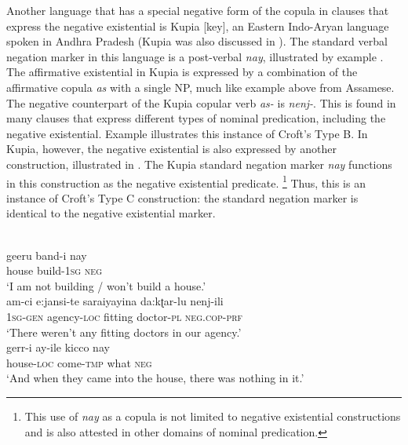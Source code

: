 ﻿\documentclass[output=paper]{langsci/langscibook}
\begin{document}
Another language that has a special negative form of the copula in clauses
that express the negative existential is Kupia [key], an Eastern
Indo-Aryan language spoken in Andhra Pradesh (Kupia was also discussed in
).  The standard verbal negation marker in this language is a
post-verbal \textit{nay}, illustrated by example
. The affirmative existential in Kupia is
expressed by a combination of the affirmative copula \textit{as} with a
single NP, much like example  above from
Assamese. The negative counterpart of the Kupia copular verb
\textit{as-} is \textit{nenj-}. This is found in many clauses that express
different types of nominal predication, including the negative existential.
Example  illustrates this instance of Croft's
Type B. In Kupia, however, the negative existential is also
expressed by another construction, illustrated in
. The Kupia standard negation
marker \textit{nay} functions in this construction as the negative
existential predicate.%
%
\footnote{This use of \textit{nay} as a copula is not
limited to negative existential constructions and is also attested in other
domains of nominal predication.} 
%
Thus, this is an instance of Croft's Type C construction: the standard
negation marker is identical to the negative existential marker. 
%
\begin{exe}\ex
\begin{xlist}
    \ex\label{ex:ieur-kupia-buildhouse}
\\
    \gll geeru band-i nay \\
house build-\textsc{1sg} \textsc{neg} \\
    \glt `I am not building / won't build a house.'
\ex\label{ex:ieur-kupia-agency}
  \\
\gll am-ci e:jansi-te saraiyayina da:kʈar-lu   nenj-ili\\
\textsc{1sg}-\textsc{gen} agency-\textsc{loc} fitting doctor-\textsc{pl}
\textsc{neg.cop-prf}\\
\glt `There weren't any fitting doctors in our agency.'
\ex\label{ex:ieur-kupia-emptyhouse}
\\
\gll gerr-i ay-ile kicco nay\\
house-\textsc{loc} come-\textsc{tmp}   what   \textsc{neg}\\
\glt `And when they came into the house, there was nothing in it.'
\end{xlist}\end{exe}
\end{document}
